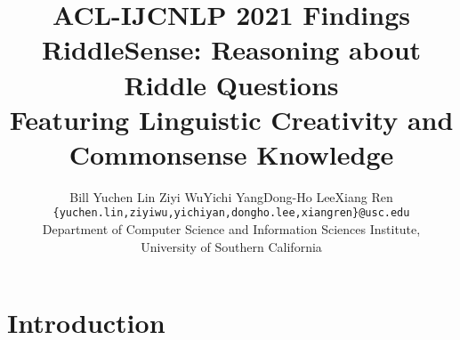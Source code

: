 \documentclass[11pt,a4paper]{article}
\begin{document}
\title{\vspace*{-0.5in}
{{\small \hfill ACL-IJCNLP 2021 Findings}\\
\vspace*{.25in}}
RiddleSense: Reasoning about Riddle Questions \\ Featuring Linguistic Creativity and Commonsense Knowledge}


\author{
Bill Yuchen Lin \quad Ziyi Wu\quad Yichi Yang\quad  Dong-Ho Lee\quad Xiang Ren\\
\texttt{\{yuchen.lin,ziyiwu,yichiyan,dongho.lee,xiangren\}@usc.edu}\\
Department of Computer Science and Information Sciences Institute,  \\ University of Southern California\\
}


\maketitle



\begin{abstract}

\end{abstract}

\section{Introduction}\label{sec:intro}


% 


% 
 
\end{document}
